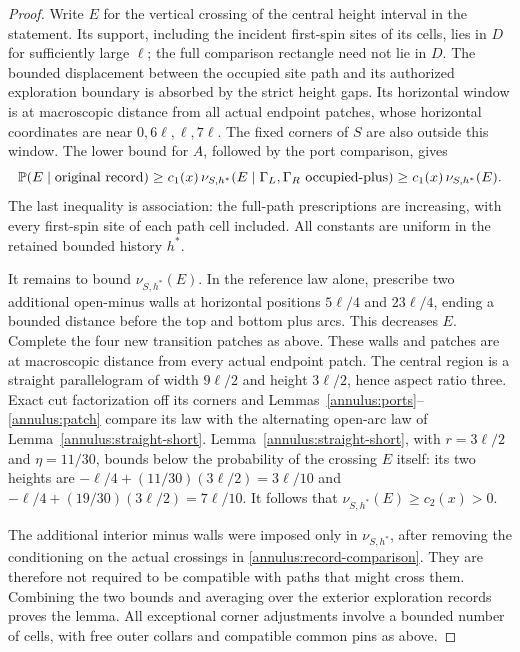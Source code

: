 \begin{proof}
Write $E$ for the vertical crossing of the central height interval in
the statement.  Its support, including the incident first-spin sites of its cells,
lies in $D$ for sufficiently large $\ell$; the full comparison rectangle
need not lie in $D$.  The bounded displacement between the occupied site
path and its authorized exploration boundary is absorbed by the strict
height gaps.  Its horizontal window is at macroscopic distance from
all actual endpoint patches, whose horizontal coordinates are near
$0,6\ell,\ell,7\ell$.  The fixed corners of $S$ are also outside this
window.  The lower bound for $A$, followed by the port comparison,
gives
\begin{equation}\label{annulus:record-comparison}
 \mathbb P(E\mid\hbox{original record})
 \geq c_1(x)\,
 \nu_{S,h^*}(E\mid\Gamma_L,\Gamma_R\hbox{ occupied-plus})
 \geq c_1(x)\,\nu_{S,h^*}(E).
\end{equation}
The last inequality is association: the full-path prescriptions are
increasing, with every first-spin site of each path cell included.
All constants are uniform in the retained bounded history $h^*$.

It remains to bound $\nu_{S,h^*}(E)$.  In the reference law alone, prescribe
two additional open-minus walls at horizontal positions $5\ell/4$
and $23\ell/4$, ending a bounded distance before the top and bottom
plus arcs.  This decreases $E$.  Complete the four new transition
patches as above.  These walls and patches are at macroscopic distance
from every actual endpoint patch.  The central region is a straight
parallelogram of width $9\ell/2$ and height $3\ell/2$, hence aspect
ratio three.  Exact cut factorization off its corners and
Lemmas~\ref{annulus:ports}--\ref{annulus:patch} compare its law with
the alternating open-arc law of
Lemma~\ref{annulus:straight-short}.  Lemma~\ref{annulus:straight-short}, with $r=3\ell/2$ and
$\eta=11/30$, bounds below the probability of the crossing $E$ itself:
its two heights are
$-\ell/4+(11/30)(3\ell/2)=3\ell/10$ and
$-\ell/4+(19/30)(3\ell/2)=7\ell/10$.
It follows that
$\nu_{S,h^*}(E)\geq c_2(x)>0$.

The additional interior minus walls were imposed only in $\nu_{S,h^*}$,
after removing the conditioning on the actual crossings in
\eqref{annulus:record-comparison}.  They are therefore not required to
be compatible with paths that might cross them.  Combining the two
bounds and averaging over the exterior exploration records proves the
lemma.  All exceptional corner adjustments involve a bounded number
of cells, with free outer collars and compatible common pins as above.
\end{proof}

